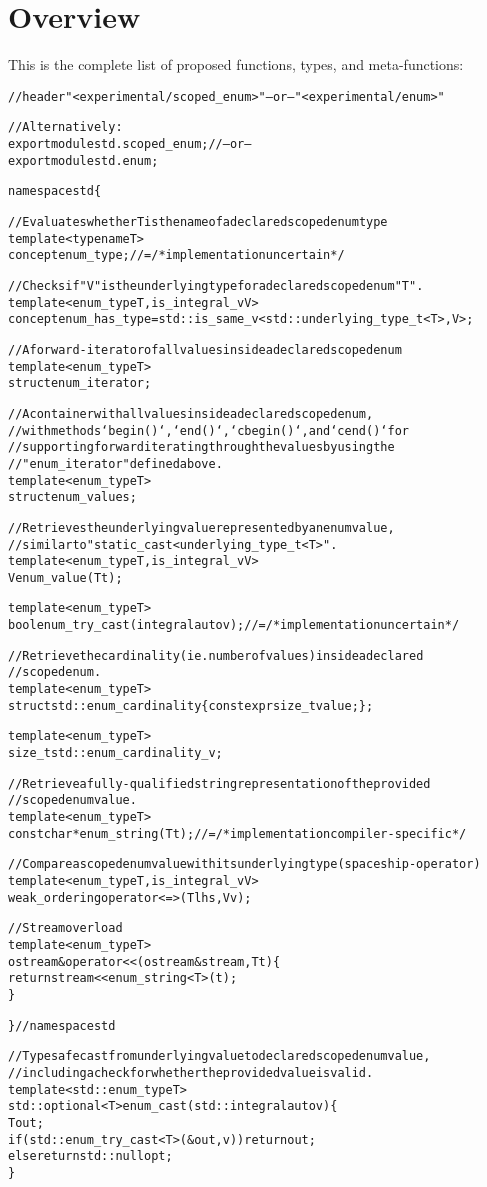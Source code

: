 \documentclass[a4paper, 12pt]{article}
\begin{document}
\newpage
\section{Overview}

This is the complete list of proposed functions, types, and meta-functions:

\begin{alltt}\footnotesize
// header "<experimental/scoped\_enum>" -- or -- "<experimental/enum>"

// Alternatively:
export module std.scoped\_enum; // -- or --
export module std.enum;

namespace std \{

  // Evaluates whether T is the name of a declared scoped enum type
  template<typename T>
  concept enum\_type; // = /* implementation uncertain */

  // Checks if "V" is the underlying type for a declared scoped enum "T".
  template<enum\_type T, is\_integral\_v V>
  concept enum\_has\_type = std::is\_same\_v<std::underlying\_type\_t<T>, V>;

  // A forward-iterator of all values inside a declared scoped enum
  template<enum\_type T>
  struct enum\_iterator;

  // A container with all values inside a declared scoped enum,
  // with methods `begin()`, `end()`, `cbegin()`, and `cend()` for
  // supporting forward iterating through the values by using the
  // "enum\_iterator" defined above.
  template<enum\_type T>
  struct enum\_values;

  // Retrieves the underlying value represented by an enum value,
  // similar to "static\_cast<underlying\_type\_t<T>".
  template<enum\_type T, is\_integral\_v V>
  V enum\_value(T t);

  template<enum\_type T>
  bool enum\_try\_cast(integral auto v); // = /* implementation uncertain */

  // Retrieve the cardinality (ie. number of values) inside a declared
  // scoped enum.
  template<enum\_type T>
  struct std::enum\_cardinality \{ constexpr size\_t value; \};

  template<enum\_type T>
  size\_t std::enum\_cardinality\_v;

  // Retrieve a fully-qualified string representation of the provided
  // scoped enum value.
  template<enum\_type T>
  const char* enum\_string(T t); // = /* implementation compiler-specific */

  // Compare a scoped enum value with its underlying type (spaceship-operator)
  template<enum\_type T, is\_integral\_v V>
  weak\_ordering operator<=>(T lhs, V v);

  // Stream overload
  template<enum\_type T>
  ostream& operator<<(ostream& stream, T t) \{
    return stream << enum\_string<T>(t);
  \}

\} // namespace std

// Typesafe cast from underlying value to declared scoped enum value,
// including a check for whether the provided value is valid.
template<std::enum\_type T>
std::optional<T> enum\_cast(std::integral auto v) \{
  T out;
  if (std::enum\_try\_cast<T>(&out, v)) return out;
  else return std::nullopt;
\}

\end{alltt}
\end{document}
